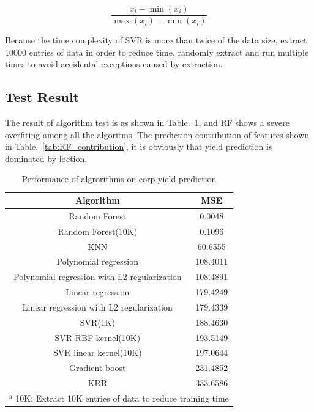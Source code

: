 \documentclass[conference]{IEEEtran}
\begin{document}
\begin{equation}
  \frac{x_i-\min \left( x_i \right)}{\max \left( x_i \right) -\min \left( x_i \right)}
\label{eq:standarlize}
\end{equation}

Because the time complexity of SVR is more than twice of the data size\cite{clarke2005analysis}, extract 10000 entries of data in order to reduce time, randomly extract and run multiple times to avoid accidental exceptions caused by extraction.



\subsection{Test Result}
The result of algorithm test is as shown in Table.~\ref{tab:result}, and RF shows a severe overfiting among all the algoritms. The prediction contribution of features shown in Table.~\ref{tab:RF_contribution}, it is obviously that yield prediction is dominated by loction.

\begin{table}[htbp]
  \caption{Performance of algrorithms on corp yield prediction}
  \begin{center}
  \begin{tabular}{|c|c|}
  \hline
  Algorithm                                    & MSE      \\
  \hline
  Random Forest                                & 0.0048   \\
  Random Forest(10K)                           & 0.1096   \\
  KNN                                          & 60.6555  \\
  Polynomial regression                        & 108.4011 \\
  Polynomial regression with L2 regularization & 108.4891 \\
  Linear regression                            & 179.4249 \\
  Linear regression with L2 regularization     & 179.4339 \\
  SVR(1K)                                      & 188.4630 \\
  SVR RBF kernel(10K)                          & 193.5149 \\
  SVR linear kernel(10K)                       & 197.0644 \\
  Gradient boost                               & 231.4852 \\
  KRR                                          & 333.6586 \\
  \hline
  \multicolumn{2}{l}{$^{\mathrm{a}}$ 10K: Extract 10K entries of data to reduce training time} \\
  \end{tabular}
  \label{tab:result}
  \end{center}
\end{table}
\end{document}
